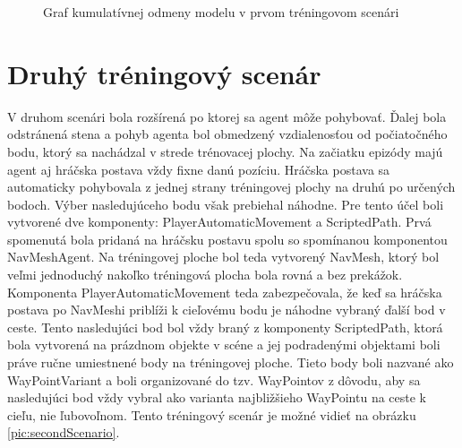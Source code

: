 \documentclass[slovak, master]{diploma}
\begin{document}
\begin{figure}[!htbp]
    \centering
    \caption{Graf kumulatívnej odmeny modelu v prvom tréningovom scenári}
    \label{plt:firstScenario}
\end{figure}

\section{Druhý tréningový scenár}
\label{sec:SecondScenario}
V druhom scenári bola rozšírená po ktorej sa agent môže pohybovať. Ďalej bola odstránená stena a pohyb agenta bol obmedzený vzdialenosťou od počiatočného bodu, ktorý sa nachádzal v strede trénovacej plochy. Na začiatku epizódy majú agent aj hráčska postava vždy fixne danú pozíciu. Hráčska postava sa automaticky pohybovala z jednej strany tréningovej plochy na druhú po určených bodoch. Výber nasledujúceho bodu však prebiehal náhodne. Pre tento účel boli vytvorené dve komponenty: PlayerAutomaticMovement a ScriptedPath. Prvá spomenutá bola pridaná na hráčsku postavu spolu so spomínanou komponentou NavMeshAgent. Na tréningovej ploche bol teda vytvorený NavMesh, ktorý bol veľmi jednoduchý nakoľko tréningová plocha bola rovná a bez prekážok. Komponenta PlayerAutomaticMovement teda zabezpečovala, že keď sa hráčska postava po NavMeshi priblíži k cieľovému bodu je náhodne vybraný ďalší bod v ceste. Tento nasledujúci bod bol vždy braný z komponenty ScriptedPath, ktorá bola vytvorená na prázdnom objekte v scéne a jej podradenými objektami boli práve ručne umiestnené body na tréningovej ploche. Tieto body boli nazvané ako WayPointVariant a boli organizované do tzv. WayPointov z dôvodu, aby sa nasledujúci bod vždy vybral ako varianta najbližšieho WayPointu na ceste k cieľu, nie ľubovoľnom. Tento tréningový scenár je možné vidieť na obrázku \ref{pic:secondScenario}.
\end{document}
